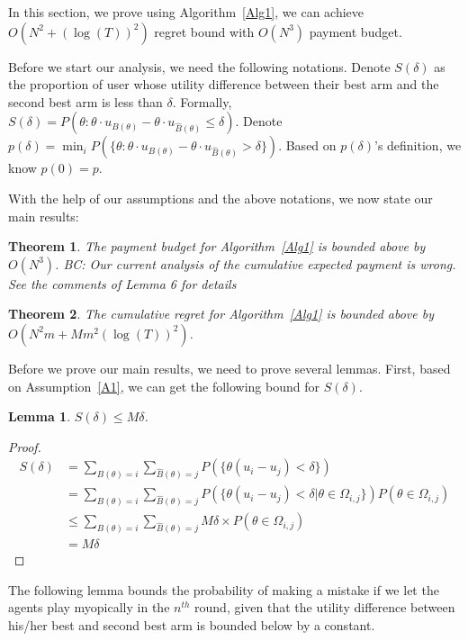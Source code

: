 \documentclass{article}
\newcommand{\bccomment}[1]{{\color{blue}BC: #1}}
\newtheorem{theorem}{Theorem}
\newtheorem{lemma}{Lemma}
\begin{document}
In this section, we prove using Algorithm~\ref{Alg1}, we can achieve $O(N^2+(\log(T))^2)$ regret bound with $O(N^3)$ payment budget.

Before we start our analysis, we need the following notations. Denote $S(\delta)$ as the proportion of user whose utility difference between their best arm and the second best arm is less than $\delta$. Formally, $S(\delta)=P(\theta: \theta \cdot u_{B(\theta)}-\theta\cdot u_{\hat{B}(\theta)}\leq \delta)$. Denote $p(\delta)=\min_{i}P(\{\theta:\theta\cdot u_{B(\theta)}-\theta\cdot u_{\hat{B}(\theta)}>\delta\})$. Based on $p(\delta)$'s definition, we know $p(0)=p$. 

With the help of our assumptions and the above notations, we now state our main results:

\begin{theorem}
The payment budget for Algorithm~\ref{Alg1} is bounded above by $O(N^3)$. \bccomment{Our current analysis of the cumulative expected payment is wrong. See the comments of Lemma 6 for details}
\label{rst:budget}
\end{theorem}


\begin{theorem}
The cumulative regret for Algorithm~\ref{Alg1} is bounded above by $O(N^2 m + M m^2(\log(T))^2)$.
\label{rst:regret}
\end{theorem}

Before we prove our main results, we need to prove several lemmas. First, based on Assumption~\ref{A1}, we can get the following bound for $S(\delta)$.

\begin{lemma}
$S(\delta)\leq M\delta$.
\label{lemma:sdelta}
\end{lemma}

\begin{proof}
\begin{align}
S(\delta)&=\sum_{B(\theta)=i}\sum_{\hat{B}(\theta)=j}P(\{\theta(u_{i}-u_{j})<\delta\}) \nonumber \\
&=\sum_{B(\theta)=i}\sum_{\hat{B}(\theta)=j}P(\{\theta(u_{i}-u_{j})<\delta|\theta\in \Omega_{i,j}\})P(\theta\in \Omega_{i,j}) \nonumber \\
&\leq \sum_{B(\theta)=i}\sum_{\hat{B}(\theta)=j}M\delta \times P(\theta\in \Omega_{i,j}) \nonumber \\
&=M\delta \nonumber 
\end{align}
\end{proof}

The following lemma bounds the probability of making a mistake if we let the agents play myopically in the $n^{th}$ round, given that the utility difference between his/her best and second best arm is bounded below by a constant.
\end{document}
